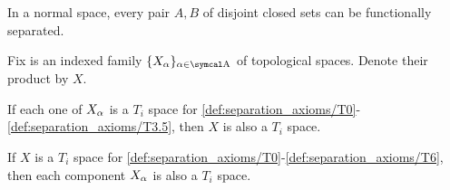 \begin{lemma}\label{thm:urysohns_lemma}\cite[1.5.11]{Engelking1989}
  In a normal space, every pair \( A, B \) of disjoint closed sets can be functionally separated.
\end{lemma}

\begin{theorem}\label{thm:separation_axioms_of_product}
  Fix is an indexed family \( \{ X_\al \}_{\al \in \CA} \) of topological spaces. Denote their product by \( X \).

  \begin{thmenum}
    \cite[theorem 2.3.11]{Engelking1989} If each one of \( X_\alpha \) is a \( T_i \) space for \ref{def:separation_axioms/T0}-\ref{def:separation_axioms/T3.5}, then \( X \) is also a \( T_i \) space.

    \cite[theorem 2.3.11]{Engelking1989} If \( X \) is a \( T_i \) space for \ref{def:separation_axioms/T0}-\ref{def:separation_axioms/T6}, then each component \( X_\alpha \) is also a \( T_i \) space.
  \end{thmenum}
\end{theorem}
